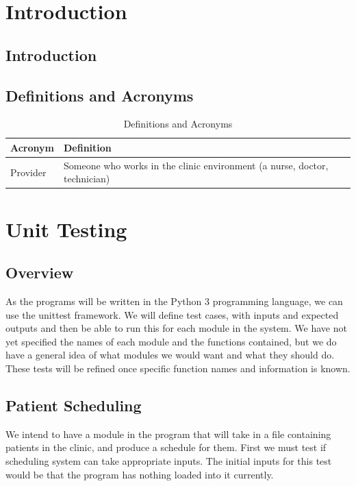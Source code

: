 \documentclass[12pt]{article}
\begin{document}
\section{Introduction}

\subsection{Introduction}

\subsection{Definitions and Acronyms} 
\begin{center}
\begin{longtable}{>{\raggedright\arraybackslash}p{}>{\raggedright\arraybackslash}p{}}
\caption{Definitions and Acronyms}\label{Table_Acronyms}\\
\toprule

\bf Acronym & \bf Definition\\\midrule
Provider & Someone who works in the clinic environment (a nurse, doctor, technician)\\\midrule

\bottomrule
\end{longtable}
\end{center}

\section{Unit Testing}
\subsection{Overview}
	As the programs will be written in the Python 3 programming language, we can use the unittest framework. We will define test cases, with inputs and expected outputs and then be able to run this for each module in the system. We have not yet specified the names of each module and the functions contained, but we do have a general idea of what modules we would want and what they should do. These tests will be refined once specific function names and information is known.

\subsection{Patient Scheduling} 
	We intend to have a module in the program that will take in a file containing patients in the clinic, and produce a schedule for them. First we must test if scheduling system can take appropriate inputs. The initial inputs for this test would be that the program has nothing loaded into it currently.
\end{document}

